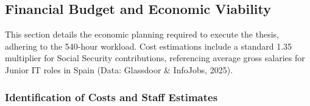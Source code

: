 \documentclass[11pt, a4paper]{article}
\begin{document}
\subsection*{Financial Budget and Economic Viability}
\label{subsec:budget}

This section details the economic planning required to execute the thesis, adhering to the 540-hour workload. Cost estimations include a standard 1.35 multiplier for Social Security contributions, referencing average gross salaries for Junior IT roles in Spain (Data: Glassdoor \& InfoJobs, 2025).

\subsubsection*{Identification of Costs and Staff Estimates}
\end{document}
